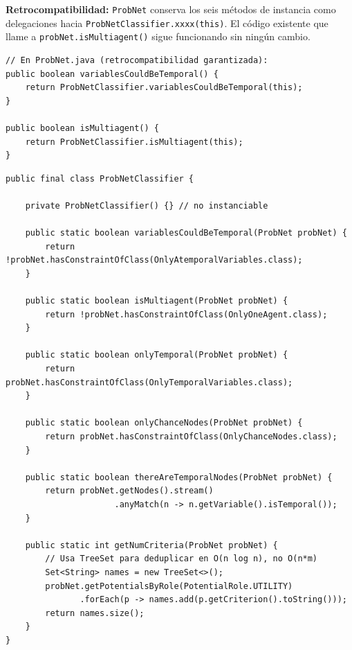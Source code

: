 \documentclass[11pt,a4paper]{article}
\newcommand{\code}[1]{\texttt{#1}}
\begin{document}
\textbf{Retrocompatibilidad:} \code{ProbNet} conserva los seis métodos de
instancia como delegaciones hacia \code{ProbNetClassifier.xxxx(this)}.
El código existente que llame a \code{probNet.isMultiagent()} sigue
funcionando sin ningún cambio.

\begin{lstlisting}[caption={Delegación en \texttt{ProbNet} después de la extracción.},
                   label=lst:classifier-deleg]
// En ProbNet.java (retrocompatibilidad garantizada):
public boolean variablesCouldBeTemporal() {
    return ProbNetClassifier.variablesCouldBeTemporal(this);
}

public boolean isMultiagent() {
    return ProbNetClassifier.isMultiagent(this);
}
\end{lstlisting}

\begin{lstlisting}[caption={Implementación en \texttt{ProbNetClassifier}.},
                   label=lst:classifier-impl]
public final class ProbNetClassifier {

    private ProbNetClassifier() {} // no instanciable

    public static boolean variablesCouldBeTemporal(ProbNet probNet) {
        return !probNet.hasConstraintOfClass(OnlyAtemporalVariables.class);
    }

    public static boolean isMultiagent(ProbNet probNet) {
        return !probNet.hasConstraintOfClass(OnlyOneAgent.class);
    }

    public static boolean onlyTemporal(ProbNet probNet) {
        return probNet.hasConstraintOfClass(OnlyTemporalVariables.class);
    }

    public static boolean onlyChanceNodes(ProbNet probNet) {
        return probNet.hasConstraintOfClass(OnlyChanceNodes.class);
    }

    public static boolean thereAreTemporalNodes(ProbNet probNet) {
        return probNet.getNodes().stream()
                      .anyMatch(n -> n.getVariable().isTemporal());
    }

    public static int getNumCriteria(ProbNet probNet) {
        // Usa TreeSet para deduplicar en O(n log n), no O(n*m)
        Set<String> names = new TreeSet<>();
        probNet.getPotentialsByRole(PotentialRole.UTILITY)
               .forEach(p -> names.add(p.getCriterion().toString()));
        return names.size();
    }
}
\end{lstlisting}

\end{document}
